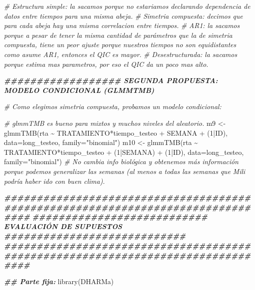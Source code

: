 \documentclass[
]{article}
\newenvironment{Shaded}{\begin{snugshade}}{\end{snugshade}}
\newcommand{\AttributeTok}[1]{\textcolor[rgb]{0.77,0.63,0.00}{#1}}
\newcommand{\CommentTok}[1]{\textcolor[rgb]{0.56,0.35,0.01}{\textit{#1}}}
\newcommand{\DecValTok}[1]{\textcolor[rgb]{0.00,0.00,0.81}{#1}}
\newcommand{\DocumentationTok}[1]{\textcolor[rgb]{0.56,0.35,0.01}{\textbf{\textit{#1}}}}
\newcommand{\FunctionTok}[1]{\textcolor[rgb]{0.00,0.00,0.00}{#1}}
\newcommand{\NormalTok}[1]{#1}
\newcommand{\OtherTok}[1]{\textcolor[rgb]{0.56,0.35,0.01}{#1}}
\newcommand{\SpecialCharTok}[1]{\textcolor[rgb]{0.00,0.00,0.00}{#1}}
\newcommand{\StringTok}[1]{\textcolor[rgb]{0.31,0.60,0.02}{#1}}
\begin{document}
\begin{Shaded}
\begin{Highlighting}[]
\CommentTok{\# Estructura simple: la sacamos porque no estariamos declarando dependencia de datos entre tiempos para una misma abeja.}
\CommentTok{\# Simetria compuesta: decimos que para cada abeja hay una misma correlacion entre tiempos.}
\CommentTok{\# AR1: la sacamos porque a pesar de tener la misma cantidad de parámetros que la de simetria compuesta, tiene un peor ajuste porque nuestros tiempos no son equidistantes como asume AR1, entonces el QIC es mayor.}
\CommentTok{\# Desestructurada: la sacamos porque estima mas parametros, por eso el QIC da un poco mas alto.}


\DocumentationTok{\#\#\#\#\#\#\#\#\#\#\#\#\#\#\#\#\#\# SEGUNDA PROPUESTA: MODELO CONDICIONAL (GLMMTMB)}

\CommentTok{\# Como elegimos simetria compuesta, probamos un modelo condicional:}

\CommentTok{\# glmmTMB es bueno para mixtos y muchos niveles del aleatorio.}
\NormalTok{m9 }\OtherTok{\textless{}{-}} \FunctionTok{glmmTMB}\NormalTok{(rta }\SpecialCharTok{\textasciitilde{}}\NormalTok{ TRATAMIENTO}\SpecialCharTok{*}\NormalTok{tiempo\_testeo }\SpecialCharTok{+}\NormalTok{ SEMANA }\SpecialCharTok{+}\NormalTok{ (}\DecValTok{1}\SpecialCharTok{|}\NormalTok{ID), }\AttributeTok{data=}\NormalTok{long\_testeo, }\AttributeTok{family=}\StringTok{"binomial"}\NormalTok{)}
\NormalTok{m10 }\OtherTok{\textless{}{-}} \FunctionTok{glmmTMB}\NormalTok{(rta }\SpecialCharTok{\textasciitilde{}}\NormalTok{ TRATAMIENTO}\SpecialCharTok{*}\NormalTok{tiempo\_testeo }\SpecialCharTok{+}\NormalTok{  (}\DecValTok{1}\SpecialCharTok{|}\NormalTok{SEMANA) }\SpecialCharTok{+}\NormalTok{ (}\DecValTok{1}\SpecialCharTok{|}\NormalTok{ID), }\AttributeTok{data=}\NormalTok{long\_testeo, }\AttributeTok{family=}\StringTok{"binomial"}\NormalTok{)}
\CommentTok{\# No cambia info biológica y obtenemos más información porque podemos generalizar las semanas (al menos a todas las semanas que Mili podría haber ido con buen clima).}

\DocumentationTok{\#\#\#\#\#\#\#\#\#\#\#\#\#\#\#\#\#\#\#\#\#\#\#\#\#\#\#\#\#\#\#\#\#\#\#\#\#\#\#\#\#\#\#\#\#\#\#\#\#\#\#\#\#\#\#\#\#\#\#\#\#\#\#\#\#\#\#\#\#\#\#\#\#\#\#\#\#\#\#\#}
\DocumentationTok{\#\#\#\#\#\#\#\#\#\#\#\#\#\#\#\#\#\#\#\#\#\#\#\#\#\#\# EVALUACIÓN DE SUPUESTOS \#\#\#\#\#\#\#\#\#\#\#\#\#\#\#\#\#\#\#\#\#\#\#\#\#\#\#\#}
\DocumentationTok{\#\#\#\#\#\#\#\#\#\#\#\#\#\#\#\#\#\#\#\#\#\#\#\#\#\#\#\#\#\#\#\#\#\#\#\#\#\#\#\#\#\#\#\#\#\#\#\#\#\#\#\#\#\#\#\#\#\#\#\#\#\#\#\#\#\#\#\#\#\#\#\#\#\#\#\#\#\#\#\#}

\DocumentationTok{\#\# Parte fija:}
\FunctionTok{library}\NormalTok{(DHARMa)}
\end{Highlighting}
\end{Shaded}
\end{document}
